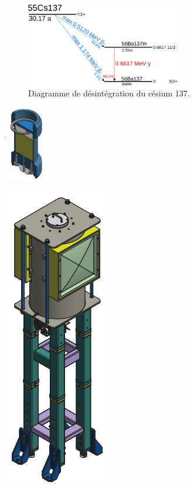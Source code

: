 \begin{figure}[!ht]
	\centering
	\includegraphics[width=0.6\textwidth]{GLA/Cesium137.png}
	\caption{Diagramme de désintégration du césium 137.}
	\label{Diagramme}
\end{figure}


\marginpar
{
	\centering
	\includegraphics[width=0.5\marginparwidth]{GLA/Source.png}
	\label{Source}
}

\marginpar
{
	\centering
	\includegraphics[width=0.5\marginparwidth]{GLA/Irradiateur.png}
	\label{Irradiateur}
}

